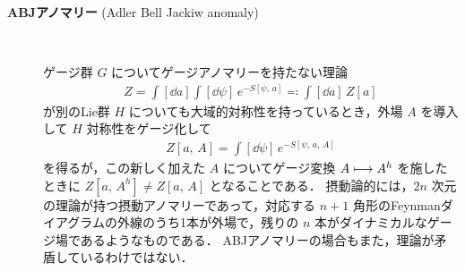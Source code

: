 \documentclass[TQFT_main]{subfiles}
\begin{document}
\begin{description}
    \item[\textbf{ABJアノマリー} (Adler Bell Jackiw anomaly)]　
    
    ゲージ群 $G$ についてゲージアノマリーを持たない理論
    \begin{align}
        Z = \int [\dd{a}] \int [\dd{\psi}]\, e^{-S[\psi,\, a]} \eqqcolon \int [\dd{a}]\, Z[a]
    \end{align}
    が別のLie群 $H$ についても大域的対称性を持っているとき，外場 $A$ を導入して $H$ 対称性をゲージ化して
    \begin{align}
        Z[a,\, A] = \int [\dd{\psi}]\, e^{-S[\psi,\, a,\, A]}
    \end{align}
    を得るが，この新しく加えた $A$ についてゲージ変換 $A \longmapsto A^h$ を施したときに $Z[a,\, A^h] \neq Z[a,\, A]$ となることである．
    摂動論的には，$2n$ 次元の理論が持つ摂動アノマリーであって，対応する $n+1$ 角形のFeynmanダイアグラムの外線のうち1本が外場で，残りの $n$ 本がダイナミカルなゲージ場であるようなものである．
    ABJアノマリーの場合もまた，理論が矛盾しているわけではない．
    

\end{description}
\end{document}
